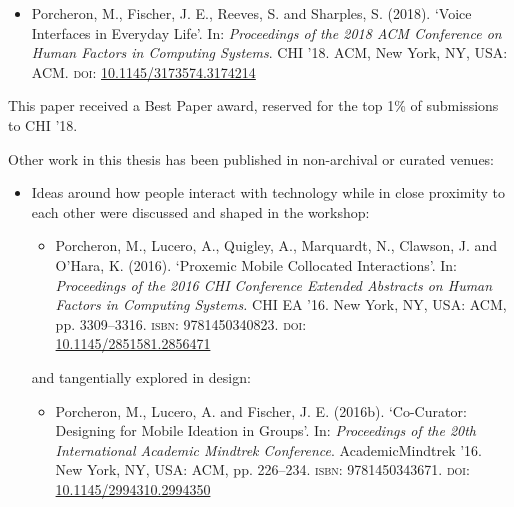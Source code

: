 \begin{itemize}
\begin{itemize}
        \item Porcheron, M., Fischer, J. E., Reeves, S. and Sharples, S. (2018). ‘Voice Interfaces in Everyday Life’. In: \textit{Proceedings of the 2018 ACM Conference on Human Factors in Computing Systems}. CHI ’18. ACM, New York, NY, USA: ACM. \textsc{doi:}  \href{https://doi.org/10.1145/3173574.3174214}{10.1145/3173574.3174214}

    \end{itemize}

    This paper received a Best Paper award, reserved for the top 1\% of submissions to CHI ’18.

\end{itemize}

\crpagebreak{}Other work in this thesis has been published in non-archival or curated venues:
\begin{itemize}

    \item Ideas around how people interact with technology while in close proximity to each other were discussed and shaped in the workshop:
    \begin{itemize}

        \item Porcheron, M., Lucero, A., Quigley, A., Marquardt, N., Clawson, J. and O’Hara, K. (2016). ‘Proxemic Mobile Collocated Interactions’. In: \textit{Proceedings of the 2016 CHI Conference Extended Abstracts on Human Factors in Computing Systems.} CHI EA ’16. New York, NY, USA: ACM, pp. 3309–3316. \textsc{isbn:} 9781450340823. \textsc{doi:} \\\href{https://doi.org/10.1145/2851581.2856471}{10.1145/2851581.2856471}


    \end{itemize} and tangentially explored in design:
    \begin{itemize}

        \item Porcheron, M., Lucero, A. and Fischer, J. E. (2016b). ‘Co-Curator: Designing for Mobile Ideation in Groups’. In: \textit{Proceedings of the 20th International Academic Mindtrek Conference}. AcademicMindtrek ’16. New York, NY, USA: ACM, pp. 226–234. \textsc{isbn:} 9781450343671. \textsc{doi:} \\\href{https://doi.org/10.1145/2994310.2994350}{10.1145/2994310.2994350}


\end{itemize}
\end{itemize}
